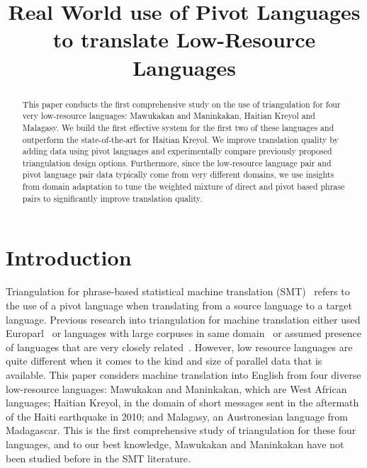 \documentclass[11pt]{article}
\title{Real World use of Pivot Languages to translate Low-Resource Languages}
\author{}
\date{}
\begin{document}

\begin{abstract}
This paper conducts the first comprehensive study on the use of triangulation for four very low-resource languages: Mawukakan and Maninkakan, Haitian Kreyol and Malagasy. We build the first effective system for the first two of these languages and outperform the state-of-the-art for Haitian Kreyol. We improve translation quality by adding data using pivot languages and experimentally compare previously proposed triangulation design options. Furthermore, since the low-resource language pair and pivot language pair data typically come from very different domains, we use insights from domain adaptation to tune the weighted mixture of direct and pivot based phrase pairs to significantly improve translation quality.
\end{abstract}

\section{Introduction}
Triangulation for phrase-based statistical machine translation (SMT)~\cite{Utiyama:07,Cohn:07} refers to the use of a pivot language when translating from a source language to a target language. Previous research into triangulation for machine translation either used Europarl~\cite{Cohn:07,Utiyama:07} or languages with large corpuses in same domain~\cite{Gispert:06} or assumed presence of languages that are very closely related~\cite{Nakov:12,NakovWang:12}. However, low resource languages are quite different when it comes to the kind and size of parallel data that is available. This paper considers machine translation into English from four diverse low-resource languages: Mawukakan and Maninkakan, which are West African languages;  Haitian Kreyol, in the domain of short messages sent in the aftermath of the Haiti earthquake in 2010; and Malagasy, an Austronesian language from Madagascar. This is the first comprehensive study of triangulation for these four languages, and to our best knowledge, Mawukakan and Maninkakan have not been studied before in the SMT literature.
\end{document}
